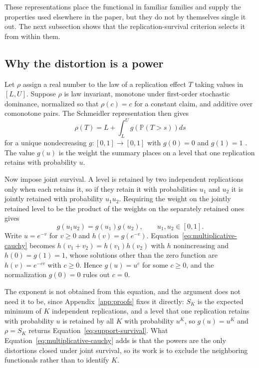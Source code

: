 \documentclass[11pt]{article}
\newcommand{\Prb}{\mathbb{P}}
\theoremstyle{remark}
\begin{document}
These representations place the functional in familiar families and supply the properties used elsewhere in the paper, but they do not by themselves single it out. The next subsection shows that the replication-survival criterion selects it from within them.

\subsection{Why the distortion is a power}
\label{app:characterization}

Let $\rho$ assign a real number to the law of a replication effect $T$ taking values in $[L,U]$. Suppose $\rho$ is law invariant, monotone under first-order stochastic dominance, normalized so that $\rho(c)=c$ for a constant claim, and additive over comonotone pairs. The Schmeidler representation then gives
\begin{equation}
\rho(T)
=
L
+
\int_L^U
g\left(\Prb(T>s)\right)
ds
\label{eq:distortion-representation}
\end{equation}
for a unique nondecreasing $g:[0,1]\to[0,1]$ with $g(0)=0$ and $g(1)=1$ \cite{schmeidler1986integral,yaari1987dual}. The value $g(u)$ is the weight the summary places on a level that one replication retains with probability $u$.

Now impose joint survival. A level is retained by two independent replications only when each retains it, so if they retain it with probabilities $u_1$ and $u_2$ it is jointly retained with probability $u_1u_2$. Requiring the weight on the jointly retained level to be the product of the weights on the separately retained ones gives
\begin{equation}
g(u_1u_2)=g(u_1)g(u_2),
\qquad
u_1,u_2\in[0,1].
\label{eq:multiplicative-cauchy}
\end{equation}
Write $u=e^{-v}$ for $v\geq0$ and $h(v)=g(e^{-v})$. Equation~\eqref{eq:multiplicative-cauchy} becomes $h(v_1+v_2)=h(v_1)h(v_2)$ with $h$ nonincreasing and $h(0)=g(1)=1$, whose solutions other than the zero function are $h(v)=e^{-cv}$ with $c\geq0$. Hence $g(u)=u^{c}$ for some $c\geq0$, and the normalization $g(0)=0$ rules out $c=0$.

The exponent is not obtained from this equation, and the argument does not need it to be, since Appendix~\ref{app:proofs} fixes it directly: $S_K$ is the expected minimum of $K$ independent replications, and a level that one replication retains with probability $u$ is retained by all $K$ with probability $u^{K}$, so $g(u)=u^{K}$ and $\rho=S_K$ returns Equation~\eqref{eq:support-survival}. What Equation~\eqref{eq:multiplicative-cauchy} adds is that the powers are the only distortions closed under joint survival, so its work is to exclude the neighboring functionals rather than to identify $K$.
\end{document}
